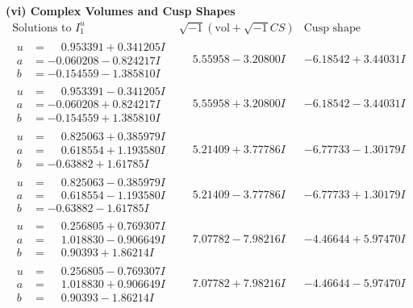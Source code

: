 \documentclass[1p]{elsarticle_modified}
\theoremstyle{definition}
\newcommand{\I}{\sqrt{-1}}
\begin{document}
\newpage\flushleft \textbf{(vi) Complex Volumes and Cusp Shapes}
$$\begin{array}{c|c|c}  
\text{Solutions to }I^u_{1}& \I (\text{vol} + \sqrt{-1}CS) & \text{Cusp shape}\\
 \hline 
\begin{aligned}
u &= \phantom{-}0.953391 + 0.341205 I \\
a &= -0.060208 - 0.824217 I \\
b &= -0.154559 - 1.385810 I\end{aligned}
 & \phantom{-}5.55958 - 3.20800 I & -6.18542 + 3.44031 I \\ \hline\begin{aligned}
u &= \phantom{-}0.953391 - 0.341205 I \\
a &= -0.060208 + 0.824217 I \\
b &= -0.154559 + 1.385810 I\end{aligned}
 & \phantom{-}5.55958 + 3.20800 I & -6.18542 - 3.44031 I \\ \hline\begin{aligned}
u &= \phantom{-}0.825063 + 0.385979 I \\
a &= \phantom{-}0.618554 + 1.193580 I \\
b &= -0.63882 + 1.61785 I\end{aligned}
 & \phantom{-}5.21409 + 3.77786 I & -6.77733 - 1.30179 I \\ \hline\begin{aligned}
u &= \phantom{-}0.825063 - 0.385979 I \\
a &= \phantom{-}0.618554 - 1.193580 I \\
b &= -0.63882 - 1.61785 I\end{aligned}
 & \phantom{-}5.21409 - 3.77786 I & -6.77733 + 1.30179 I \\ \hline\begin{aligned}
u &= \phantom{-}0.256805 + 0.769307 I \\
a &= \phantom{-}1.018830 - 0.906649 I \\
b &= \phantom{-}0.90393 + 1.86214 I\end{aligned}
 & \phantom{-}7.07782 - 7.98216 I & -4.46644 + 5.97470 I \\ \hline\begin{aligned}
u &= \phantom{-}0.256805 - 0.769307 I \\
a &= \phantom{-}1.018830 + 0.906649 I \\
b &= \phantom{-}0.90393 - 1.86214 I\end{aligned}
 & \phantom{-}7.07782 + 7.98216 I & -4.46644 - 5.97470 I \\ \hline\begin{aligned}

\end{aligned}
\end{array}$$
\end{document}
